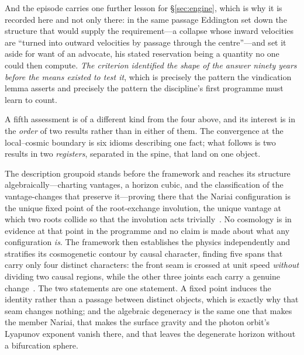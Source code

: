 \documentclass[11pt,a4paper]{article}
\begin{document}
And the episode
carries one further lesson for \S\ref{sec:engine}, which is why it is recorded here and not only there: in the
same passage Eddington set down the structure that would supply the requirement---a collapse whose inward
velocities are ``turned into outward velocities by passage through the centre''---and set it aside for want of
an advocate, his stated reservation being a quantity no one could then compute. \emph{The criterion identified
the shape of the answer ninety years before the means existed to test it}, which is precisely the pattern the
vindication lemma asserts and precisely the pattern the discipline's first programme must learn to count.

A fifth assessment is of a different kind from the four above, and its interest is in the \emph{order} of two
results rather than in either of them. The convergence at the local--cosmic boundary is six idioms describing
one fact; what follows is two results in two \emph{registers}, separated in the spine, that land on one object.

The description groupoid stands before the framework and reaches its structure algebraically---charting
vantages, a horizon cubic, and the classification of the vantage-changes that preserve it---proving there that
the Nariai configuration is the unique fixed point of the root-exchange involution, the unique vantage at which
two roots collide so that the involution acts trivially~\cite{JanzenGroupoid}. No cosmology is in evidence at
that point in the programme and no claim is made about what any configuration \emph{is}. The framework then
establishes the physics independently and stratifies its cosmogenetic contour by causal character, finding five
spans that carry only four distinct characters: the front seam is crossed at unit speed \emph{without} dividing
two causal regions, while the other three joints each carry a genuine change~\cite{JanzenCRframework}. The two
statements are one statement. A fixed point induces the identity rather than a passage between distinct objects,
which is exactly why that seam changes nothing; and the algebraic degeneracy is the same one that makes the
member Nariai, that makes the surface gravity and the photon orbit's Lyapunov exponent vanish there, and that
leaves the degenerate horizon without a bifurcation sphere.
\end{document}
